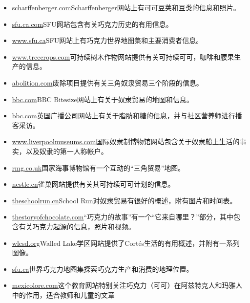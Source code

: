 \begin{itemize}
  \item \href{https://www.scharffenberger.com/chocolatefaqs3.asp}{scharffenberger.com}Scharffenberger网站上有可可豆荚和豆类的信息和照片。
  \item \href{http://www.sfu.ca/geog351fall03/groups-webpages/gp8/history/history.html}{sfu.ca.com}SFU网站包含有关巧克力历史的有用信息。
  \item \href{http://www.sfu.ca/geog351fall03/groups-webpages/gp8/consum/consum.html}{www.sfu.ca}SFU网站上有巧克力世界地图集和主要消费者信息。
  \item \href{http://www.treecrops.org}{www.treecrops.com}可持续树木作物网站提供有关可持续可可，咖啡和腰果生产的信息。
  \item \href{http://abolition.e2bn.org/slavery_43.html}{abolition.com}废除项目提供有关三角奴隶贸易三个阶段的信息。
  \item \href{http://www.bbc.co.uk/bitesize/ks3/history/industrial_era/the_slave_trade/revision/4/}{bbc.com}BBC Bitesize网站上有关于奴隶贸易的地图和信息。
  \item \href{http://www.bbc.co.uk/northernireland/schools/4_11/uptoyou/healthy/nutrientfacts5.shtml}{bbc.com}英国广播公司网站上有关于脂肪和糖的信息，并与社区营养师进行播客采访。
  \item \href{http://www.liverpoolmuseums.org.uk/ism/slavery/}{www.liverpoolmuseums.com}国际奴隶制博物馆网站包含关于奴隶船上生活的事实，以及奴隶的第一人称帐户。
  \item \href{https://www.rmg.co.uk/national-maritime-museum}{rmg.co.uk}国家海事博物馆有一个互动的“三角贸易”地图。
  \item \href{https://www.nestle.co.uk/csv2013/socialimpact/responsiblesourcing/nestlecocoaplan}{nestle.cn}雀巢网站提供有关其可持续可可计划的信息。
  \item \href{https://www.theschoolrun.com/homework-help/the-atlantic-slave-trade}{theschoolrun.cn}School Run对奴隶贸易有很好的概述，附有图片和时间表。
  \item \href{http://www.thestoryofchocolate.com}{thestoryofchocolate.com}“巧克力的故事”有一个“它来自哪里？”部分，其中包含有关巧克力起源的信息，照片和视频。
  \item \href{http://wlcsd.org/loonlake?subpage=1471242}{wlcsd.org}Walled Lake学区网站提供了Cortés生活的有用概述，并附有一系列图像。
  \item \href{http://https//www.sfu.ca/geog351fall03/groups-webpages/gp8/intro/intro.html}{sfu.ca}世界巧克力地图集探索巧克力生产和消费的地理位置。
  \item \href{http://mexicolore.co.uk/maya/chocolate/}{mexicolore.com}这个教育网站特别关注巧克力（可可）在阿兹特克人和玛雅人中的作用，适合教师和儿童的文章

\end{itemize}
